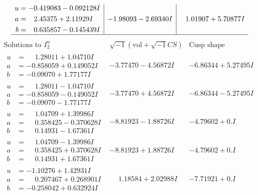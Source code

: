 \documentclass[1p]{elsarticle_modified}
\theoremstyle{definition}
\newcommand{\I}{\sqrt{-1}}
\begin{document}
$$\begin{array}{c|c|c}
\begin{aligned}
u &= -0.419083 - 0.092128 I \\
a &= \phantom{-}2.45375 + 2.11929 I \\
b &= \phantom{-}0.635857 - 0.145439 I\end{aligned}
 & -1.98093 - 2.69340 I & \phantom{-}1.01907 + 5.70877 I\\
 \hline 
 \end{array}$$\newpage$$\begin{array}{c|c|c}  
\text{Solutions to }I^u_{2}& \I (\text{vol} + \sqrt{-1}CS) & \text{Cusp shape}\\
 \hline 
\begin{aligned}
u &= \phantom{-}1.28011 + 1.04710 I \\
a &= -0.858059 + 0.149052 I \\
b &= -0.09070 + 1.77177 I\end{aligned}
 & -3.77470 - 4.56872 I & -6.86344 + 5.27495 I \\ \hline\begin{aligned}
u &= \phantom{-}1.28011 - 1.04710 I \\
a &= -0.858059 - 0.149052 I \\
b &= -0.09070 - 1.77177 I\end{aligned}
 & -3.77470 + 4.56872 I & -6.86344 - 5.27495 I \\ \hline\begin{aligned}
u &= \phantom{-}1.04709 + 1.39986 I \\
a &= \phantom{-}0.358425 - 0.370628 I \\
b &= \phantom{-}0.14931 - 1.67361 I\end{aligned}
 & -8.81923 - 1.88726 I & -4.79602 + 0. I\phantom{ +0.000000I} \\ \hline\begin{aligned}
u &= \phantom{-}1.04709 - 1.39986 I \\
a &= \phantom{-}0.358425 + 0.370628 I \\
b &= \phantom{-}0.14931 + 1.67361 I\end{aligned}
 & -8.81923 + 1.88726 I & -4.79602 + 0. I\phantom{ +0.000000I} \\ \hline\begin{aligned}
u &= -1.10276 + 1.42931 I \\
a &= \phantom{-}0.207467 + 0.268901 I \\
b &= -0.258042 + 0.632924 I\end{aligned}
 & \phantom{-}1.18584 + 2.02988 I & -7.71921 + 0. I\phantom{ +0.000000I} \\ \hline\begin{aligned}

\end{aligned}
\end{array}$$
\end{document}
